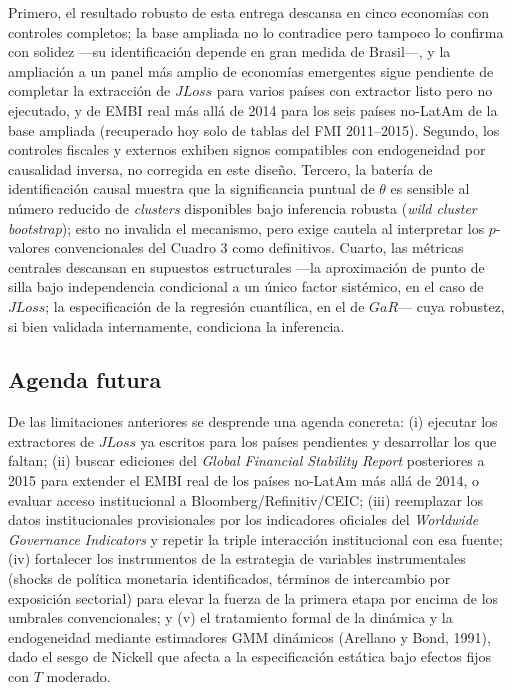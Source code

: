 \documentclass[5p,times,twocolumn,authoryear]{elsarticle}
\begin{document}
Primero, el resultado robusto de esta entrega descansa en cinco economías con controles completos; la base ampliada no lo contradice pero tampoco lo confirma con solidez —su identificación depende en gran medida de Brasil—, y la ampliación a un panel más amplio de economías emergentes sigue pendiente de completar la extracción de $JLoss$ para varios países con extractor listo pero no ejecutado, y de EMBI real más allá de 2014 para los seis países no-LatAm de la base ampliada (recuperado hoy solo de tablas del FMI 2011–2015). Segundo, los controles fiscales y externos exhiben signos compatibles con endogeneidad por causalidad inversa, no corregida en este diseño. Tercero, la batería de identificación causal muestra que la significancia puntual de $\theta$ es sensible al número reducido de \textit{clusters} disponibles bajo inferencia robusta (\textit{wild cluster bootstrap}); esto no invalida el mecanismo, pero exige cautela al interpretar los $p$-valores convencionales del Cuadro 3 como definitivos. Cuarto, las métricas centrales descansan en supuestos estructurales —la aproximación de punto de silla bajo independencia condicional a un único factor sistémico, en el caso de $JLoss$; la especificación de la regresión cuantílica, en el de $GaR$— cuya robustez, si bien validada internamente, condiciona la inferencia.

\subsection{Agenda futura}

De las limitaciones anteriores se desprende una agenda concreta: (i) ejecutar los extractores de $JLoss$ ya escritos para los países pendientes y desarrollar los que faltan; (ii) buscar ediciones del \textit{Global Financial Stability Report} posteriores a 2015 para extender el EMBI real de los países no-LatAm más allá de 2014, o evaluar acceso institucional a Bloomberg/Refinitiv/CEIC; (iii) reemplazar los datos institucionales provisionales por los indicadores oficiales del \textit{Worldwide Governance Indicators} y repetir la triple interacción institucional con esa fuente; (iv) fortalecer los instrumentos de la estrategia de variables instrumentales (shocks de política monetaria identificados, términos de intercambio por exposición sectorial) para elevar la fuerza de la primera etapa por encima de los umbrales convencionales; y (v) el tratamiento formal de la dinámica y la endogeneidad mediante estimadores GMM dinámicos (Arellano y Bond, 1991), dado el sesgo de Nickell que afecta a la especificación estática bajo efectos fijos con $T$ moderado.
\end{document}
